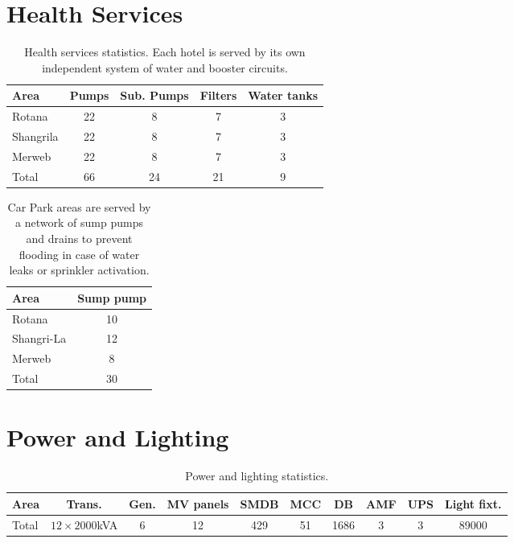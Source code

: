 \documentclass[oneside, justified, 11pt, a4paper]{tufte-book}
\begin{document}
\section{Health Services}

\begin{table}[htbp]
\begin{tabular}{lcccc}
\toprule
Area     &Pumps &Sub. Pumps &Filters &Water tanks\\
\midrule
Rotana 	&22	&8	&7	&3\\
Shangrila 	&22	&8	&7	&3\\
Merweb 	    &22	&8	&7	&3\\
\midrule
Total 	   &66	&24	&21	&9\\
\bottomrule
\end{tabular}
\caption{Health services statistics. Each hotel is served by its own independent system of water and booster circuits.}
\end{table}

\begin{table}
\begin{tabular}{l c}
\toprule
Area 	&Sump pump \\ 
\midrule
Rotana 	&10\\
Shangri-La 	&12\\
Merweb 	&8\\
Total 	&30\\
\bottomrule
\end{tabular}
\caption{Car Park areas are served by a network of sump pumps and drains to prevent flooding in case of water leaks or sprinkler activation.}
\end{table}

\section{Power and Lighting}

\begin{table}[htbp]
\vspace*{20pt}
\begin{tabular}{lccccccccc}
\toprule
Area 	&Trans. 	&Gen. 	&MV panels 	&SMDB  	&MCC  
 	     &DB 	&AMF  	&UPS  	&Light fixt. \\
\midrule
Total 	&$12\times2000$kVA	&6	&12	&429	&51	&1686	&3	&3	&89000\\
\bottomrule
\end{tabular}
\caption{Power and lighting statistics.}
\end{table}
\end{document}
